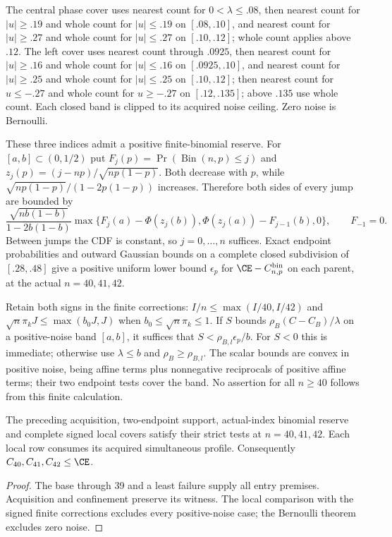 The central phase cover uses nearest count for $0<\lambda\le.08$,
then nearest count for $|u|\ge.19$ and whole count for $|u|\le.19$
on $[.08,.10]$, and nearest count for $|u|\ge.27$ and whole
count for $|u|\le.27$ on $[.10,.12]$;
whole count applies above $.12$.
The left cover uses nearest count through $.0925$, then nearest
count for $|u|\ge.16$ and whole count for $|u|\le.16$ on
$[.0925,.10]$, and nearest count for $|u|\ge.25$ and whole count
for $|u|\le.25$ on $[.10,.12]$; then nearest count for $u\le-.27$
and whole count for $u\ge-.27$ on $[.12,.135]$; above $.135$
use whole count. Each closed band is clipped to its acquired noise
ceiling. Zero noise is Bernoulli.

These three indices admit a positive finite-binomial reserve. For
$[a,b]\subset(0,1/2)$ put
$F_j(p)=\Pr(\operatorname{Bin}(n,p)\le j)$ and
$z_j(p)=(j-np)/\sqrt{np(1-p)}$. Both decrease with $p$, while
$\sqrt{np(1-p)}/(1-2p(1-p))$ increases. Therefore both sides of
every jump are bounded by
\begin{equation}\label{j:finite:binomialslack}
 \frac{\sqrt{nb(1-b)}}{1-2b(1-b)}
 \max\{F_j(a)-\Phi(z_j(b)),\Phi(z_j(a))-F_{j-1}(b),0\},
 \qquad F_{-1}=0.
\end{equation}
Between jumps the CDF is constant, so $j=0,\ldots,n$ suffices.
Exact endpoint probabilities and outward Gaussian bounds on a complete
closed subdivision of $[.28,.48]$ give a positive uniform lower bound
$\epsilon_p$ for $\CE-C^{\rm bin}_{n,p}$ on each parent, at the actual
$n=40,41,42$.

Retain both signs in the finite corrections:
$I/n\le\max(I/40,I/42)$ and
$\sqrt n\pi_kJ\le\max(b_0J,J)$ when $b_0\le\sqrt n\pi_k\le1$.
If $S$ bounds $\rho_B(C-C_B)/\lambda$ on a positive-noise band
$[a,b]$, it suffices that $S<\rho_{B,l}\epsilon_p/b$.
For $S<0$ this is immediate; otherwise use $\lambda\le b$ and
$\rho_B\ge\rho_{B,l}$. The scalar bounds are convex in positive
noise, being affine terms plus nonnegative reciprocals of positive
affine terms; their two endpoint tests cover the band. No assertion
for all $n\ge40$ follows from this finite calculation.

\begin{proposition}\label{j:finite:numerical4042}
The preceding acquisition, two-endpoint support, actual-index binomial
reserve and complete signed local covers satisfy their strict tests
at $n=40,41,42$. Each local row consumes its acquired simultaneous
profile. Consequently $C_{40},C_{41},C_{42}\le\CE$.
\end{proposition}
\begin{proof}
The base through 39 and a least failure supply all entry premises.
Acquisition and confinement preserve its witness. The local comparison
with the signed finite corrections excludes every positive-noise case;
the Bernoulli theorem excludes zero noise.
\end{proof}

